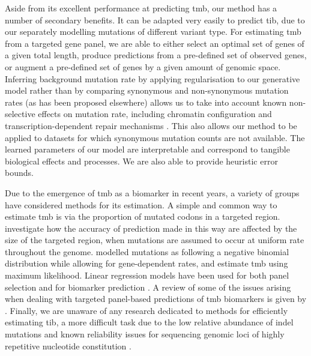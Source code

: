 \documentclass[10pt,twoside,openright]{report}
\begin{document}
Aside from its excellent performance at predicting \acrshort{tmb}, our method has a number of secondary benefits. It can be adapted very easily to predict \acrshort{tib}, due to our separately modelling mutations of different variant type. For estimating \acrshort{tmb} from a targeted gene panel, we are able to either select an optimal set of genes of a given total length, produce predictions from a pre-defined set of observed genes, or augment a pre-defined set of genes by a given amount of genomic space. Inferring background mutation rate by applying regularisation to our generative model rather than by comparing synonymous and non-synonymous mutation rates (as has been proposed elsewhere) allows us to take into account known non-selective effects on mutation rate, including chromatin configuration \citep{makova_effects_2015} and transcription-dependent repair mechanisms \citep{fong_intertwined_2013}. This also allows our method to be applied to datasets for which synonymous mutation counts are not available. The learned parameters of our model are interpretable and correspond to tangible biological effects and processes. We are also able to provide heuristic error bounds.

Due to the emergence of \acrshort{tmb} as a biomarker in recent years, a variety of groups have considered methods for its estimation. A simple and common way to estimate \acrshort{tmb} is via the proportion of mutated codons in a targeted region. \citet{budczies_optimizing_2019} investigate how the accuracy of prediction made in this way are affected by the size of the targeted region, when mutations are assumed to occur at uniform rate throughout the genome. \citet{yao_ectmb_2020} modelled mutations as following a negative binomial distribution while allowing for gene-dependent rates, and estimate \acrshort{tmb} using maximum likelihood. Linear regression models have been used for both panel selection \citep{lyu_mutation_2018} and for biomarker prediction \citep{guo_exon_2020}. A review of some of the issues arising when dealing with targeted panel-based predictions of \acrshort{tmb} biomarkers is given by \citet{wu_designing_2019}. Finally, we are unaware of any research dedicated to methods for efficiently estimating \acrshort{tib}, a more difficult task due to the low relative abundance of indel mutations and known reliability issues for sequencing genomic loci of highly repetitive nucleotide constitution \citep{narzisi_challenge_2015}.
\end{document}
